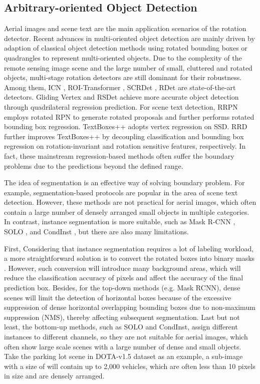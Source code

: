 \documentclass[10pt,journal,compsoc]{IEEEtran}
\begin{document}
\subsection{Arbitrary-oriented Object Detection}
Aerial images and scene text are the main application scenarios of the rotation detector. Recent advances in multi-oriented object detection are mainly driven by adaption of classical object detection methods using rotated bounding boxes or quadrangles to represent multi-oriented objects. Due to the complexity of the remote sensing image scene and the large number of small, cluttered and rotated objects, multi-stage rotation detectors are still dominant for their robustness. Among them, ICN \cite{azimi2018towards}, ROI-Transformer \cite{ding2018learning}, SCRDet \cite{yang2019scrdet}, RDet \cite{yang2021r3det} are state-of-the-art detectors. Gliding Vertex \cite{xu2020gliding} and RSDet \cite{qian2021learning} achieve more accurate object detection through quadrilateral regression prediction. For scene text detection, RRPN \cite{ma2018arbitrary} employs rotated RPN to generate rotated proposals and further performs rotated bounding box regression. TextBoxes++ \cite{liao2018textboxes++} adopts vertex regression on SSD. RRD \cite{liao2018rotation}  further improves TextBoxes++ by decoupling classification and bounding box regression on rotation-invariant and rotation sensitive features, respectively. In fact, these mainstream regression-based methods often suffer the boundary problems due to the predictions beyond the defined range.

The idea of segmentation is an effective way of solving boundary problem. For example, segmentation-based protocols \cite{tian2019learning, liao2020real} are popular in the area of scene text detection. However, these methods are not practical for aerial images, which often contain a large number of densely arranged small objects in multiple categories. In contrast, instance segmentation is more suitable, such as Mask R-CNN \cite{he2017mask}, SOLO \cite{wang2020solo}, and CondInst \cite{tian2020conditional}, but there are also many limitations.

First, Considering that instance segmentation requires a lot of labeling workload, a more straightforward solution is to convert the rotated boxes into binary masks \cite{wang2019mask}. However, such conversion will introduce many background areas, which will reduce the classification accuracy of pixels and affect the accuracy of the final prediction box. Besides, for the top-down methods (e.g. Mask RCNN), dense scenes will limit the detection of horizontal boxes because of the excessive suppression of dense horizontal overlapping bounding boxes due to non-maximum suppression (NMS), thereby affecting subsequent segmentation. Last but not least, the bottom-up methods, such as SOLO and CondInst, assign different instances to different channels, so they are not suitable for aerial images, which often show large scale scenes with a large number of dense and small objects. Take the parking lot scene in DOTA-v1.5 \cite{xia2018dota} dataset as an example, a sub-image with a size of  will contain up to 2,000 vehicles, which are often less than 10 pixels in size and are densely arranged.
\end{document}
